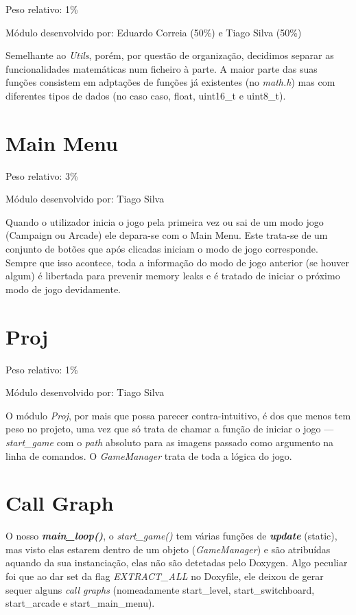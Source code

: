 \documentclass{report}
\begin{document}
Peso relativo: 1\%

Módulo desenvolvido por: Eduardo Correia (50\%) e Tiago Silva (50\%)
\newline

Semelhante ao \textit{Utils}, porém, por questão de organização, decidimos separar as funcionalidades matemáticas num ficheiro à parte. A maior parte das suas funções consistem em adptações de funções já existentes (no \textit{math.h}) mas com diferentes tipos de dados (no caso caso, float, uint16\_t e uint8\_t).

\section{Main Menu}

Peso relativo: 3\%

Módulo desenvolvido por: Tiago Silva
\newline

Quando o utilizador inicia o jogo pela primeira vez ou sai de um modo jogo (Campaign ou Arcade) ele depara-se com o Main Menu. Este trata-se de um conjunto de botões que após clicadas iniciam o modo de jogo corresponde. Sempre que isso acontece, toda a informação do modo de jogo anterior (se houver algum) é libertada para prevenir memory leaks e é tratado de iniciar o próximo modo de jogo devidamente.

\section{Proj}

Peso relativo: 1\%

Módulo desenvolvido por: Tiago Silva
\newline

O módulo \textit{Proj}, por mais que possa parecer contra-intuitivo, é dos que menos tem peso no projeto, uma vez que só trata de chamar a função de iniciar o jogo --- \textit{start\_game} com o \textit{path} absoluto para as imagens passado como argumento na linha de comandos. O \textit{GameManager} trata de toda a lógica do jogo.

\section{Call Graph}

O nosso \textbf{\textit{main\_loop()}}, o \textit{start\_game()} tem várias funções de \textbf{\textit{update}} (static), mas visto elas estarem dentro de um objeto (\textit{GameManager}) e são atribuídas aquando da sua instanciação, elas não são detetadas pelo Doxygen. Algo peculiar foi que ao dar set da flag \textit{EXTRACT\_ALL} no Doxyfile, ele deixou de gerar sequer alguns \textit{call graphs} (nomeadamente start\_level, start\_switchboard, start\_arcade e start\_main\_menu).
\end{document}
